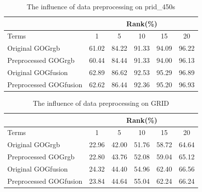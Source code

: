 \documentclass[conference,compsoc]{IEEEtran}
\begin{document}
\begin{table}[H]
\caption{The influence of data preprocessing on prid\_450s}
\begin{tabular}{|l|c|c|c|c|c|}
\hline
 & \multicolumn{5}{|c|}{Rank(\%)} \\
 \hline
Terms  &1 &5 & 10 &15& 20\\
\hline
Original GOGrgb&61.02& 84.22& 91.33& 94.09& 96.22\\
\hline
Preprocessed GOGrgb &60.44& 84.44& 91.33& 94.00& 96.13\\
\hline
Original GOGfusion &62.89& 86.62& 92.53& 95.29& 96.89\\
\hline
Preprocessed GOGfusion &62.62& 86.44& 92.36& 95.20& 96.93\\
 \hline
 
\end{tabular}
\end{table}
\begin{table}[H]
\caption{The influence of data preprocessing on GRID}
\begin{tabular}{|l|c|c|c|c|c|}
\hline
 & \multicolumn{5}{|c|}{Rank(\%)} \\
 \hline
Terms  &1 &5 & 10 &15& 20\\
\hline
Original GOGrgb&22.96& 42.00& 51.76& 58.72& 64.64\\
\hline
Preprocessed GOGrgb &22.80& 43.76& 52.08& 59.04& 65.12\\
\hline
Original GOGfusion &24.32& 44.40& 54.96& 62.40& 66.56\\
\hline
Preprocessed GOGfusion &23.84& 44.64& 55.04& 62.24& 66.24\\
 \hline
 
\end{tabular}
\end{table}

\end{document}
